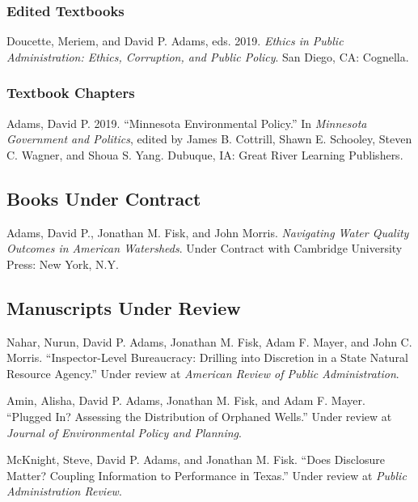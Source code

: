 \documentclass[12pt,letterpaper]{article}
\renewenvironment{itemize}{
  \begin{list}{}{
    \setlength{\leftmargin}{1.5em}
    \setlength{\itemsep}{0.25em}
    \setlength{\parskip}{0pt}
    \setlength{\parsep}{0.25em}
  }
}{
  \end{list}
}
\begin{document}
\subsubsection*{Edited Textbooks}
\begin{itemize}\leftmargin=2pt\itemindent=-15pt
  \item Doucette, Meriem, and David P. Adams, eds. 2019. \emph{Ethics in Public Administration: Ethics, Corruption, and Public Policy}. San Diego, CA: Cognella.
\end{itemize}

\subsubsection*{Textbook Chapters}
\begin{itemize}\leftmargin=2pt\itemindent=-15pt
  \item Adams, David P. 2019. ``Minnesota Environmental Policy.'' In \emph{Minnesota Government and Politics}, edited by James B. Cottrill, Shawn E. Schooley, Steven C. Wagner, and Shoua S. Yang. Dubuque, IA: Great River Learning Publishers.
\end{itemize}

\subsection*{Books Under Contract}

\begin{itemize}\leftmargin=2pt\itemindent=-15pt\leftmargin=2pt\itemindent=-15pt
  \item Adams, David P., Jonathan M. Fisk, and John Morris. \emph{Navigating Water Quality Outcomes in American Watersheds}. Under Contract with Cambridge University Press: New York, N.Y.
\end{itemize}

\subsection*{Manuscripts Under Review}
\begin{itemize}\leftmargin=2pt\itemindent=-15pt\leftmargin=2pt\itemindent=-15pt
  
  \item Nahar, Nurun, David P. Adams, Jonathan M. Fisk, Adam F. Mayer, and John C. Morris. ``Inspector-Level Bureaucracy: Drilling into Discretion in a State Natural Resource Agency.'' Under review at \emph{American Review of Public Administration}.
  
  \item Amin, Alisha, David P. Adams, Jonathan M. Fisk, and Adam F. Mayer. ``Plugged In? Assessing the Distribution of Orphaned Wells.'' Under review at \emph{Journal of Environmental Policy and Planning}.
  
  \item McKnight, Steve, David P. Adams, and Jonathan M. Fisk. ``Does Disclosure Matter? Coupling Information to Performance in Texas.'' Under review at \emph{Public Administration Review}.

\end{itemize}
\end{document}
